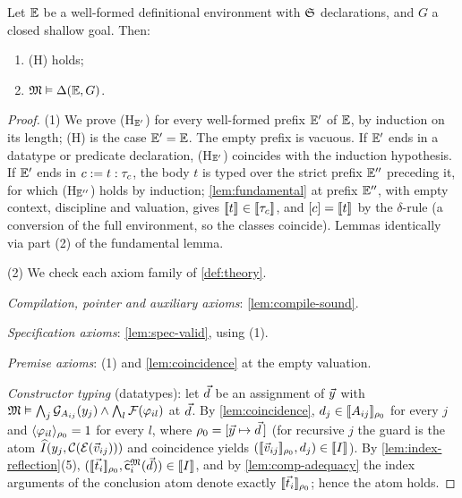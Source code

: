 \begin{theorem}
\label{thm:env-validity}
Let $\mathbb{E}$ be a well-formed definitional environment with $\mathfrak{S}$
declarations, and $G$ a closed shallow goal.  Then:
\begin{enumerate}[leftmargin=2em]
\item (H) holds;
\item $\mathfrak{M} \vDash \Delta(\mathbb{E},G)$.
\end{enumerate}
\end{theorem}

\begin{proof}
(1) We prove (H$_{\mathbb{E}'}$) for every well-formed prefix $\mathbb{E}'$ of
$\mathbb{E}$, by induction on its length; (H) is the case $\mathbb{E}' = \mathbb{E}$.
The empty prefix is vacuous.  If $\mathbb{E}'$ ends in a datatype or
predicate declaration, (H$_{\mathbb{E}'}$) coincides with the induction
hypothesis.  If $\mathbb{E}'$ ends in $c \mathrel{:=} t : \tau_c$, the body $t$ is
typed over the strict prefix $\mathbb{E}''$ preceding it, for which
(H$_{\mathbb{E}''}$) holds by induction; \cref{lem:fundamental} at prefix
$\mathbb{E}''$, with empty context, discipline and valuation, gives
$[\![ t ]\!]_{} \in [\![ \tau_c ]\!]_{}$, and $[c] = [\![ t ]\!]_{}$ by the
$\delta$-rule (a conversion of the full environment, so the classes
coincide).  Lemmas identically via part (2) of the fundamental lemma.

(2) We check each axiom family of \cref{def:theory}.

\emph{Compilation, pointer and auxiliary axioms}:
\cref{lem:compile-sound}.

\emph{Specification axioms}: \cref{lem:spec-valid}, using (1).

\emph{Premise axioms}: (1) and \cref{lem:coincidence} at the empty
valuation.

\emph{Constructor typing} (datatypes): let $\vec{d}$ be an assignment of
$\vec{y}$ with $\mathfrak{M} \vDash \bigwedge_j \mathcal{G}_{A_{ij}}(y_j) \wedge
\bigwedge_l \mathcal{F}(\varphi_{il})$ at $\vec{d}$.  By \cref{lem:coincidence},
$d_j \in [\![ A_{ij} ]\!]_{\rho_0}$ for every $j$ and
$\langle \varphi_{il} \rangle_{\rho_0} = 1$ for every $l$, where $\rho_0 =
[\vec{y} \mapsto \vec{d}\,]$ (for recursive $j$ the guard is the atom
$\widehat{I}(y_j, \mathcal{C}(\mathcal{E}(\vec{v}_{ij})))$ and coincidence yields
$([\![ \vec{v}_{ij} ]\!]_{\rho_0}, d_j) \in [\![ I ]\!]_{}$).  By
\cref{lem:index-reflection}(5), $([\![ \vec{t}_i ]\!]_{\rho_0},
\widehat{\mathsf{c}}_i^{\mathfrak{M}}(\vec{d})) \in [\![ I ]\!]_{}$, and by
\cref{lem:comp-adequacy} the index arguments of the conclusion atom
denote exactly $[\![ \vec{t}_i ]\!]_{\rho_0}$; hence the atom holds.


\end{proof}
